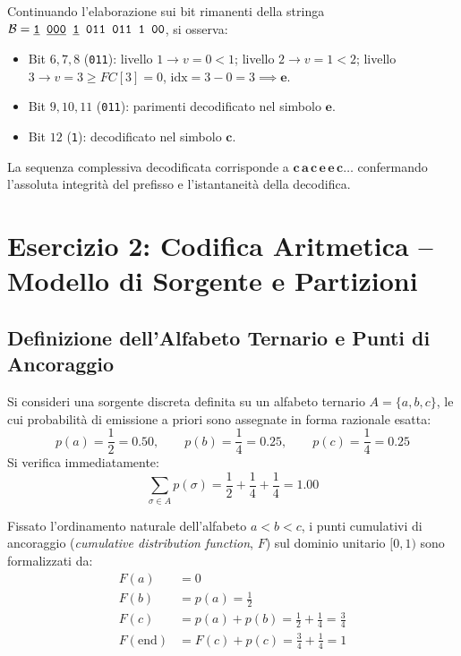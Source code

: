 \begin{remark}
Continuando l'elaborazione sui bit rimanenti della stringa $\mathcal{B} = \texttt{\underline{1} \underline{000} \underline{1} 011 011 1 00}$, si osserva:
\begin{itemize}
  \item Bit $6, 7, 8$ (\texttt{011}): livello $1 \to v=0<1$; livello $2 \to v=1<2$; livello $3 \to v=3 \ge FC[3]=0$, $\text{idx} = 3-0=3 \implies \mathbf{e}$.
  \item Bit $9, 10, 11$ (\texttt{011}): parimenti decodificato nel simbolo $\mathbf{e}$.
  \item Bit $12$ (\texttt{1}): decodificato nel simbolo $\mathbf{c}$.
\end{itemize}
La sequenza complessiva decodificata corrisponde a $\mathbf{c\,a\,c\,e\,e\,c}\dots$ confermando l'assoluta integrit\`a del prefisso e l'istantaneit\`a della decodifica.
\end{remark}

\FloatBarrier
\section{Esercizio 2: Codifica Aritmetica -- Modello di Sorgente e Partizioni}
\label{sec:esercizio-aritmetica-modello}

\subsection{Definizione dell'Alfabeto Ternario e Punti di Ancoraggio}
\label{subsec:modello-ternario-aritmetica}

Si consideri una sorgente discreta definita su un alfabeto ternario $A = \{a, b, c\}$, le cui probabilit\`a di emissione a priori sono assegnate in forma razionale esatta:
\begin{equation}
  p(a) = \frac{1}{2} = 0.50, \qquad p(b) = \frac{1}{4} = 0.25, \qquad p(c) = \frac{1}{4} = 0.25
\end{equation}
Si verifica immediatamente:
\begin{equation}
  \sum_{\sigma \in A} p(\sigma) = \frac{1}{2} + \frac{1}{4} + \frac{1}{4} = 1.00
\end{equation}

Fissato l'ordinamento naturale dell'alfabeto $a < b < c$, i punti cumulativi di ancoraggio (\textit{cumulative distribution function}, $F$) sul dominio unitario $[0, 1)$ sono formalizzati da:
\begin{align}
  F(a) &= 0 \label{eq:cumulativa-a} \\
  F(b) &= p(a) = \frac{1}{2} \label{eq:cumulativa-b} \\
  F(c) &= p(a) + p(b) = \frac{1}{2} + \frac{1}{4} = \frac{3}{4} \label{eq:cumulativa-c} \\
  F(\text{end}) &= F(c) + p(c) = \frac{3}{4} + \frac{1}{4} = 1 \label{eq:cumulativa-end}
\end{align}

